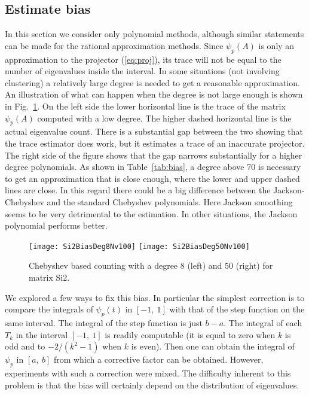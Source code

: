 \documentclass[12pt]{article}		\usepackage{tabls,multirow}
\newcommand{\ab}{[a, \ b]}
\def\nref#1{(\ref{#1})}
\begin{document}
\subsection{Estimate bias}\label{sec:bias}  
In this section we consider only polynomial methods, although similar
statements can be made for the rational approximation methods.  Since
$\psi_p(A)$ is only an approximation to the projector \nref{eq:proj},
its trace will not be equal to the number of eigenvalues inside the
interval. In some situations (not involving clustering) a relatively
large degree is needed to get a reasonable approximation. An
illustration of what can happen when the degree is not large enough is
shown in Fig.~\ref{fig:Si2Bias}.  On the left side the lower
horizontal line is the trace of the matrix $\psi_p(A)$ computed with a
low degree. The higher dashed horizontal line is the actual eigenvalue
count. There is a substantial gap between the two showing that the trace
estimator does work, but it estimates a trace of an inaccurate
projector. The right side of the figure shows that the gap narrows
substantially for a higher degree polynomials. As shown in
Table~\ref{tab:bias}, a degree above 70 is necessary to get an
approximation that is close enough, where the lower and upper dashed
lines are close. In this regard there could be a big difference
between the Jackson-Chebyshev and the standard Chebyshev
polynomials. Here Jackson smoothing seems to be very detrimental to
the estimation. In other situations, the Jackson polynomial performs
better.

\begin{figure}[hbt]
\begin{center} 
\texttt{[image: Si2BiasDeg8Nv100]} 
\texttt{[image: Si2BiasDeg50Nv100]} 
\end{center} 
\caption{Chebyshev based counting with a degree 8 (left) and
50 (right) for matrix Si2.
\label{fig:Si2Bias}}
\end{figure}
  
We explored a few ways to fix this bias. In particular the simplest
correction is to compare the integrals of $\psi_p(t)$ in $[-1, \ 1]$
with that of the step function on the same interval. The integral of
the step function is just $b-a$.  The integral of each $T_k$ in the
interval $[-1, \ 1]$ is readily computable (it is equal to zero when
$k$ is odd and to $-2/(k^2 -1)$ when $k$ is even).  Then one can
obtain the integral of $\psi_p$ in $\ab$ from which a corrective
factor can be obtained. However, experiments with such a correction
were mixed. The difficulty inherent to this problem is that the bias will
certainly depend on the distribution of eigenvalues.
\end{document}
